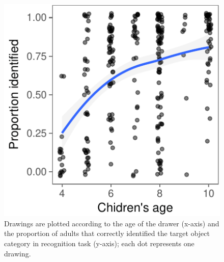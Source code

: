 \documentclass[10pt, letterpaper]{article}
\newenvironment{CodeChunk}{}{}
\begin{document}
\begin{CodeChunk}
\begin{figure}[H]

{\centering \includegraphics{figs/recByAge-1} 

}

\caption[Drawings are plotted according to the age of the drawer (x-axis) and the proportion of adults that correctly identified the target object category in recognition task (y-axis)]{Drawings are plotted according to the age of the drawer (x-axis) and the proportion of adults that correctly identified the target object category in recognition task (y-axis); each dot represents one drawing.}\label{fig:recByAge}
\end{figure}
\end{CodeChunk}
\end{document}

